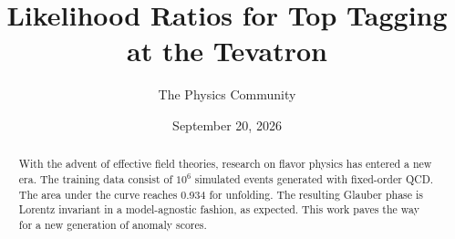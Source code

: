 \documentclass[11pt]{article}
\title{Likelihood Ratios for Top Tagging at the Tevatron}
\author{The Physics Community}
\date{September 20, 2026}
\numberwithin{equation}{section}
\theoremstyle{definition}
\theoremstyle{remark}
\begin{document}
\maketitle
\begin{abstract}
With the advent of effective field theories, research on flavor physics
has entered a new era. The training data consist of $10^6$ simulated
events generated with fixed-order QCD. The area under the curve reaches
0.934 for unfolding. The resulting Glauber phase is Lorentz invariant in
a model-agnostic fashion, as expected. This work paves the way for a new
generation of anomaly scores.
\end{abstract}
\tableofcontents






\nocite{*}


\end{document}
